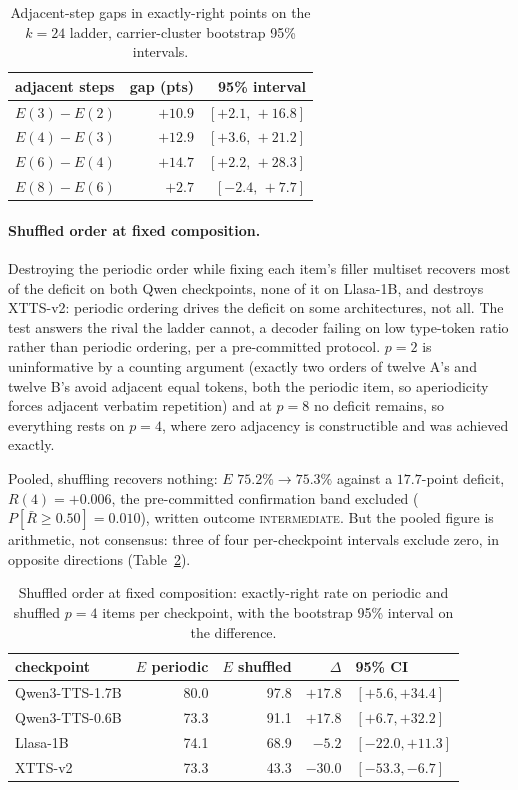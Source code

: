 \begin{table}[htbp]
\centering
\caption{Adjacent-step gaps in exactly-right points on the $k{=}24$
ladder, carrier-cluster bootstrap 95\% intervals.}
\label{tab:oddgaps}
\small
\begin{tabular}{@{}lrr@{}}
\toprule
adjacent steps & gap (pts) & 95\% interval \\
\midrule
$E(3)-E(2)$ & $+10.9$ & $[+2.1,\,+16.8]$ \\
$E(4)-E(3)$ & $+12.9$ & $[+3.6,\,+21.2]$ \\
$E(6)-E(4)$ & $+14.7$ & $[+2.2,\,+28.3]$ \\
$E(8)-E(6)$ & $+2.7$  & $[-2.4,\,+7.7]$ \\
\bottomrule
\end{tabular}
\end{table}

\paragraph{Shuffled order at fixed composition.} Destroying the
periodic order while fixing each item's filler multiset recovers most
of the deficit on both Qwen checkpoints, none of it on Llasa-1B, and
destroys XTTS-v2: periodic ordering drives the deficit on some
architectures, not all. The test answers the rival the ladder cannot,
a decoder failing on low type-token ratio rather than periodic
ordering, per a pre-committed protocol. $p{=}2$ is uninformative by a
counting argument (exactly two orders of twelve A's and twelve B's avoid
adjacent equal tokens, both the periodic item, so aperiodicity forces
adjacent verbatim repetition) and at $p{=}8$ no deficit remains, so
everything rests on $p{=}4$, where zero adjacency is constructible and
was achieved exactly.

Pooled, shuffling recovers nothing: $E$ $75.2\% \to 75.3\%$ against a
$17.7$-point deficit, $R(4)=+0.006$, the pre-committed confirmation
band excluded ($P[\bar R \ge 0.50]=0.010$), written outcome
\textsc{intermediate}. But the pooled figure is arithmetic, not
consensus: three of four per-checkpoint intervals exclude zero, in
opposite directions (Table~\ref{tab:shuffled}).

\begin{table}[tp]\centering
\caption{Shuffled order at fixed composition: exactly-right rate on periodic and shuffled $p{=}4$ items per checkpoint, with the bootstrap 95\% interval on the difference.}
\label{tab:shuffled}
\begin{tabular}{@{}lrrrl@{}}
\toprule
checkpoint & $E$ periodic & $E$ shuffled & $\Delta$ & 95\% CI \\
\midrule
Qwen3-TTS-1.7B & 80.0 & 97.8 & $+17.8$ & $[+5.6, +34.4]$ \\
Qwen3-TTS-0.6B & 73.3 & 91.1 & $+17.8$ & $[+6.7, +32.2]$ \\
Llasa-1B       & 74.1 & 68.9 & $-5.2$  & $[-22.0, +11.3]$ \\
XTTS-v2        & 73.3 & 43.3 & $-30.0$ & $[-53.3, -6.7]$ \\
\bottomrule
\end{tabular}
\end{table}

